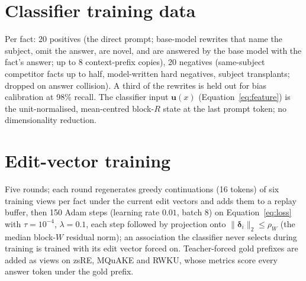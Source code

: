 \documentclass{article}
\theoremstyle{remark}
\theoremstyle{definition}
\begin{document}
\section{Classifier training data}
\label{app:classifier}
Per fact: 20 positives (the direct prompt; base-model rewrites that name the subject, omit the answer, are novel, and are answered by the base model with the fact's answer; up to 8 context-prefix copies), 20 negatives (same-subject competitor facts up to half, model-written hard negatives, subject transplants; dropped on answer collision). A third of the rewrites is held out for bias calibration at 98\% recall. The classifier input $\mathbf u(x)$ (Equation~\eqref{eq:feature}) is the unit-normalised, mean-centred block-$R$ state at the last prompt token; no dimensionality reduction.

\section{Edit-vector training}
\label{app:edits}
Five rounds; each round regenerates greedy continuations (16 tokens) of six training views per fact under the current edit vectors and adds them to a replay buffer, then 150 Adam steps (learning rate $0.01$, batch 8) on Equation~\eqref{eq:loss} with $\tau=10^{-4}$, $\lambda=0.1$, each step followed by projection onto $\|\boldsymbol\delta_i\|_2\le\rho_W$ (the median block-$W$ residual norm); an association the classifier never selects during training is trained with its edit vector forced on. Teacher-forced gold prefixes are added as views on zsRE, MQuAKE and RWKU, whose metrics score every answer token under the gold prefix.
\end{document}
